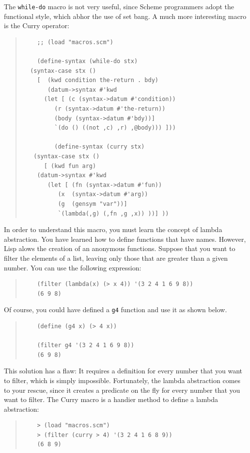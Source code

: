\documentclass[a4paper,12pt]{book}
\begin{document}
The \verb|while-do| macro is not very useful,
since Scheme programmers adopt the functional
style, which abhor the use of set bang.
A much more interesting macro is the
Curry operator:
\begin{quote}\label{page:lambda2}
	\begin{verbatim}
	;; (load "macros.scm")

	(define-syntax (while-do stx)
  (syntax-case stx ()
    [  (kwd condition the-return . bdy)
       (datum->syntax #'kwd
	  (let [ (c (syntax->datum #'condition))
		 (r (syntax->datum #'the-return))
		 (body (syntax->datum #'bdy))]
	     `(do () ((not ,c) ,r) ,@body))) ]))

	     (define-syntax (curry stx)
   (syntax-case stx ()
      [ (kwd fun arg)
	(datum->syntax #'kwd
	   (let [ (fn (syntax->datum #'fun))
		  (x  (syntax->datum #'arg))
		  (g  (gensym "var"))]
	      `(lambda(,g) (,fn ,g ,x)) ))] ))
	\end{verbatim}
\end{quote}
In order to understand this macro, you
must learn the concept of lambda abstraction.
You have learned how to define functions
that have names. However,
Lisp alows the creation of
an anonymous functions.
Suppose that you want to filter the
elements of a list, leaving only those
that are greater than a given number.
You can use the following expression:
\begin{quote}
	\begin{verbatim}
	(filter (lambda(x) (> x 4)) '(3 2 4 1 6 9 8))
	(6 9 8)
	\end{verbatim}
\end{quote}
Of course, you could have defined a 
\verb|g4| function and use it as shown below.
\begin{quote}
	\begin{verbatim}
	(define (g4 x) (> 4 x))

	(filter g4 '(3 2 4 1 6 9 8))
	(6 9 8)
	\end{verbatim}
\end{quote}
This solution has a flaw: It requires a
definition for every number that you
want to filter, which is simply impossible.
Fortunately, the lambda abstraction comes
to your rescue, since it 
creates a predicate on the fly for every
number that you want to filter. The Curry
macro is a handier method to define a lambda
abstraction:
\begin{quote}
	\begin{verbatim}
	> (load "macros.scm")
	> (filter (curry > 4) '(3 2 4 1 6 8 9))
	(6 8 9)
	\end{verbatim}
\end{quote}
\end{document}
